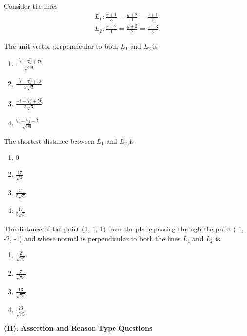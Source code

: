 Consider the lines
\begin{align*}
L_1: \frac{x + 1}{3} = \frac{y + 2}{1} = \frac{z + 1}{2}
\end{align*}
\begin{align*}
L_2: \frac{x - 2}{1}=\frac{y + 2}{2} = \frac{z - 3}{3}
\end{align*}
\item The unit vector perpendicular to both $L_1$ and $L_2$ is
\begin{enumerate}
\item $\frac{-\hat{i} + 7\hat{j} + 7\hat{k}}{\sqrt{99}}$
\item $\frac{-\hat{i} - 7\hat{j} + 5\hat{k}}{5\sqrt{3}}$
\item $\frac{-\hat{i} + 7\hat{j} + 5\hat{k}}{5\sqrt{3}}$
\item $\frac{7\hat{i} - 7\hat{j} - \hat{k}}{\sqrt{99}}$
\end{enumerate}

\item The shortest distance between $L_1$ and $L_2$ is
\begin{enumerate}
\item 0
\item $\frac{17}{\sqrt{3}}$
\item $\frac{41}{5\sqrt{3}}$
\item $\frac{17}{5\sqrt{3}}$
\end{enumerate}

\item The distance of the point (1, 1, 1) from the plane passing through the point (-1, -2, -1) and whose normal is perpendicular to both the lines $L_1$ and $L_2$ is
\begin{enumerate}
\item $\frac{2}{\sqrt{75}}$
\item $\frac{7}{\sqrt{75}}$
\item $\frac{13}{\sqrt{75}}$
\item $\frac{23}{\sqrt{75}}$
\end{enumerate}

\textbf{(H). Assertion and Reason Type Questions}


